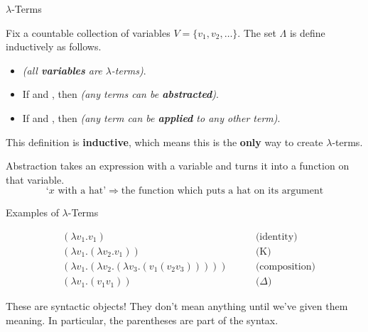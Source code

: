 \documentclass[10pt]{beamer}
\begin{document}
\begin{frame}{$\lambda$-Terms}

\begin{definition}
Fix a countable collection of variables $V = \{v_1, v_2, \dots\}$.
The set $\Lambda$ is define inductively as follows.
\begin{itemize}
\item {} \textit{(all \textbf{variables} are $\lambda$-terms)}.
\item If  and , then  \textit{(any terms can be \textbf{abstracted})}.
\item If  and , then  \textit{(any term can be \textbf{applied} to any other term)}.
\end{itemize}
\end{definition}
\nxt

This definition is \textbf{inductive}, which means this is the \textbf{only} way to create $\lambda$-terms.
\nxt

Abstraction takes an expression with a variable and turns it into a function on that variable. 
\begin{displaymath}
\text{`$x$ with a hat'} \Longrightarrow \text{the function which puts a hat on its argument}
\end{displaymath}
\end{frame}

\begin{frame}{Examples of $\lambda$-Terms}

\begin{align*}
&(\lambda v_1 . v_1) &\qquad \text{(identity)}\\
&(\lambda v_1 . (\lambda v_2 . v_1)) &\qquad \text{(K)}\\
&(\lambda v_1 . (\lambda v_2 . (\lambda v_3 . (v_1 (v_2 v_3))))) &\qquad \text{(composition)}\\
&(\lambda v_1 . (v_1v_1)) &\qquad \text{($\Delta$)}
\end{align*}
\nxt

\begin{important}
These are syntactic objects! They don't mean anything until we've given them meaning. In particular, the parentheses are part of the syntax.
\end{important}
\end{frame}
\end{document}
